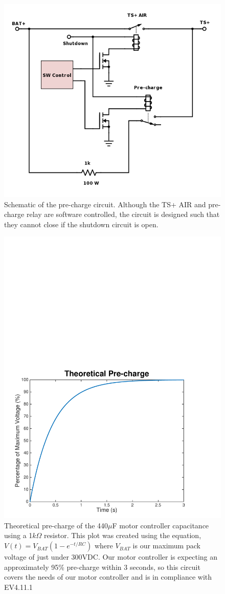 \documentclass{article}
\begin{document}
\begin{figure}[H]
    \centering
    \includegraphics[width = 0.7 \textwidth]{precharge_schem}
    \caption{Schematic of the pre-charge circuit. Although the TS+ AIR and pre-charge relay are software controlled, the circuit is designed such that they cannot close if the shutdown circuit is open.}
    \label{fig:precharge_schem}
\end{figure}

\begin{figure}[H]
    \centering
    \includegraphics[width = 0.8 \textwidth]{precharge_voltage}
    \caption{Theoretical pre-charge of the 440$\mu$F motor controller capacitance using a 1$k\Omega$ resistor. This plot was created using the equation, $V(t) = V_{BAT}(1 - e^{-t/RC})$ where $V_{BAT}$ is our maximum pack voltage of just under 300VDC. Our motor controller is expecting an approximately 95\% pre-charge within 3 seconds, so this circuit covers the needs of our motor controller and is in compliance with EV4.11.1 }
    \label{fig:precharge_voltage}
\end{figure}
\end{document}
